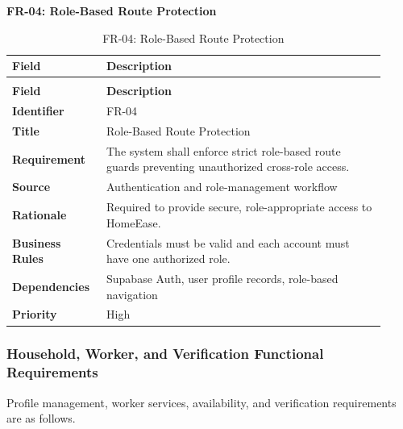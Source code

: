 \documentclass[12pt,a4paper]{article}
\begin{document}
\noindent\textbf{FR-04: Role-Based Route Protection}\par
\vspace{4pt}
\begingroup\small\setlength{\tabcolsep}{4pt}\renewcommand{\arraystretch}{1.15}
\begin{longtable}{|>{\raggedright\arraybackslash}p{0.22\linewidth}|>{\raggedright\arraybackslash}p{0.70\linewidth}|}
\caption{FR-04: Role-Based Route Protection}\label{tab:fr-04}\\
\hline
\textbf{Field} & \textbf{Description} \\ \hline
\endfirsthead
\multicolumn{2}{c}{Table \thetable\ Role-Based Route Protection (continued)}\\
\hline
\textbf{Field} & \textbf{Description} \\ \hline
\endhead
\textbf{Identifier} & FR-04 \\ \hline
\textbf{Title} & Role-Based Route Protection \\ \hline
\textbf{Requirement} & The system shall enforce strict role-based route guards preventing unauthorized cross-role access. \\ \hline
\textbf{Source} & Authentication and role-management workflow \\ \hline
\textbf{Rationale} & Required to provide secure, role-appropriate access to HomeEase. \\ \hline
\textbf{Business Rules} & Credentials must be valid and each account must have one authorized role. \\ \hline
\textbf{Dependencies} & Supabase Auth, user profile records, role-based navigation \\ \hline
\textbf{Priority} & High \\ \hline
\end{longtable}
\endgroup
\clearpage

\subsubsection{Household, Worker, and Verification Functional Requirements}
Profile management, worker services, availability, and verification requirements are as follows.
\end{document}
